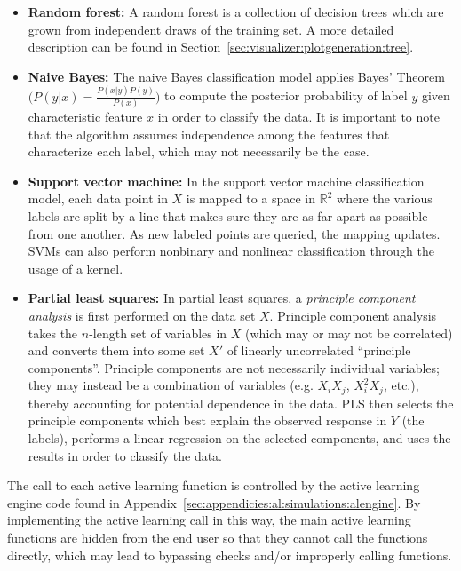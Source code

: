 \tablespacing
\begin{itemize}
	\item \textbf{Random forest:} A random forest is a collection of decision 
	trees which are grown from independent draws of the training set. A more 
	detailed description can be found in 
	Section~\ref{sec:visualizer:plotgeneration:tree}.
	
	\item \textbf{Naive Bayes:} The naive Bayes classification model applies 
	Bayes' Theorem $\big(P(y|x) = \frac{P(x|y)P(y)}{P(x)}\big)$ to compute the 
	posterior probability of label $y$ given characteristic feature $x$ in 
	order to classify the data. It is important to note that the algorithm 
	assumes independence among the features that characterize each label, which 
	may not necessarily be the case.
	
	\item \textbf{Support vector machine:} In the support vector machine 
	classification model, each data point in $X$ is 
	mapped to a space in $\mathbb{R}^2$ where the various labels are split by a 
	line that makes sure they are as far apart as possible from one another. 
	As new labeled points are queried, the mapping 
	updates. SVMs can also perform nonbinary and nonlinear classification 
	through the usage of a kernel.
	
	\item \textbf{Partial least squares:} In partial least squares, 
	a \textit{principle component analysis} is first performed on the data set 
	$X$. Principle component analysis 
	takes the $n$-length set of variables in $X$ (which may or may not be 
	correlated) and converts them into some set $X'$ of linearly uncorrelated 
	``principle components''. Principle components are not necessarily 
	individual variables; they may instead be a combination of variables (e.g. 
	$X_iX_j$, $X^2_iX_j$, etc.), thereby accounting for potential dependence in 
	the data. PLS then selects the principle components which best explain the 
	observed response in $Y$ (the labels), performs a linear regression on the 
	selected components, and uses the results in order to classify the data. 
\end{itemize}
\bodyspacing

The call to each active learning function is controlled by the active learning 
engine code found in Appendix~\ref{sec:appendicies:al:simulations:alengine}. By 
implementing the active learning call in this way, the main active learning 
functions are hidden from the end user so that they cannot call the functions 
directly, which may lead to bypassing checks and/or improperly calling 
functions.



